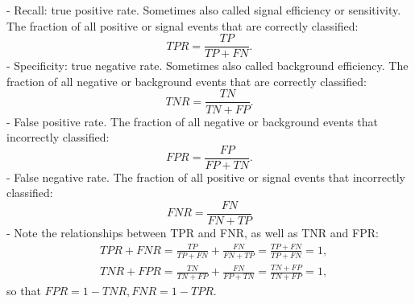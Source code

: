 \documentclass[12pt,a4paper]{article}
\begin{document}
- Recall: true positive rate. Sometimes also called signal efficiency or sensitivity. The fraction of all positive or signal events that are correctly classified:
$$
T P R=\frac{T P}{T P+F N} .
$$
- Specificity: true negative rate. Sometimes also called background efficiency. The fraction of all negative or background events that are correctly classified:
$$
T N R=\frac{T N}{T N+F P} .
$$
- False positive rate. The fraction of all negative or background events that incorrectly classified:
$$
F P R=\frac{F P}{F P+T N} .
$$
- False negative rate. The fraction of all positive or signal events that incorrectly classified:
$$
F N R=\frac{F N}{F N+T P}
$$
- Note the relationships between TPR and FNR, as well as TNR and FPR:
$$
\begin{aligned}
& T P R+F N R=\frac{T P}{T P+F N}+\frac{F N}{F N+T P}=\frac{T P+F N}{T P+F N}=1, \\
& T N R+F P R=\frac{T N}{T N+F P}+\frac{F N}{F P+T N}=\frac{T N+F P}{T N+F P}=1,
\end{aligned}
$$
so that $F P R=1-T N R, F N R=1-T P R$.
\end{document}

